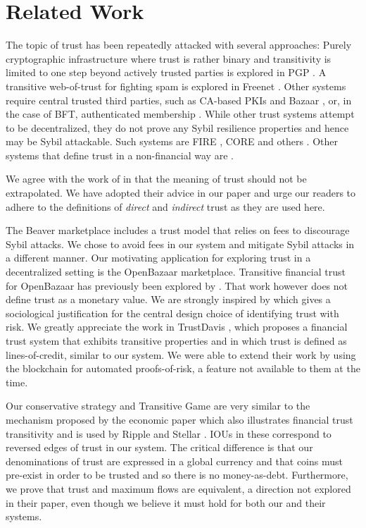 \section{Related Work}
  The topic of trust has been repeatedly attacked with several approaches: Purely cryptographic infrastructure where trust
  is rather binary and transitivity is limited to one step beyond actively trusted parties is explored in PGP \cite{pgp}. A
  transitive web-of-trust for fighting spam is explored in Freenet \cite{freenet}. Other systems require central trusted
  third parties, such as CA-based PKIs \cite{pki} and Bazaar \cite{bazaar}, or, in the case of BFT, authenticated membership
  \cite{byzantine}. While other trust systems attempt to be decentralized, they do not prove any Sybil resilience properties
  and hence may be Sybil attackable. Such systems are FIRE \cite{fire}, CORE \cite{core} and others \cite{openrep,ghkkw,rk}.
  Other systems that define trust in a non-financial way are \cite{mui,beta,pace,vpc,sdt,wot,pathfinder}.

  We agree with the work of \cite{badtrust} in that the meaning of trust should not be extrapolated. We have adopted their
  advice in our paper and urge our readers to adhere to the definitions of \textit{direct} and \textit{indirect} trust as
  they are used here.

  The Beaver marketplace \cite{beaver} includes a trust model that relies on
  fees to discourage Sybil attacks. We chose to avoid fees in our system and mitigate Sybil attacks in a different manner.
  Our motivating application for exploring trust in a decentralized setting is the OpenBazaar marketplace. Transitive
  financial trust for OpenBazaar has previously been explored by \cite{dionyziz}. That work however does not define trust
  as a monetary value. We are strongly inspired by \cite{kmrs}
  which gives a sociological justification for the central design choice of identifying trust with
  risk. We greatly appreciate the work in TrustDavis \cite{davis}, which proposes a financial trust system that exhibits
  transitive properties and in which trust is defined as lines-of-credit, similar to our system. We were able to extend
  their work by using the blockchain for automated proofs-of-risk, a feature not available to them at the time.

  Our conservative strategy and Transitive Game are very similar to the mechanism proposed by the economic paper
  \cite{iou} which also illustrates financial trust transitivity and is used by Ripple \cite{ripple} and Stellar
  \cite{stellar}.  IOUs in these correspond to reversed edges of trust in our system. The critical difference is that our
  denominations of trust are expressed in a global currency and that coins must pre-exist in order to be trusted and so there
  is no money-as-debt. Furthermore, we prove that trust and maximum flows are equivalent, a direction not explored in their
  paper, even though we believe it must hold for both our and their systems.
